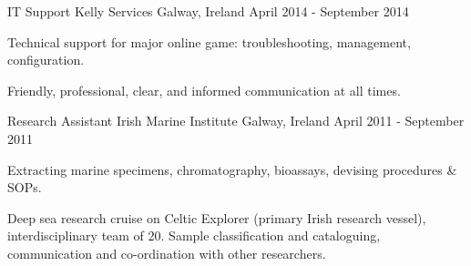 \begin{cventries}
\cventry
{IT Support} %
{Kelly Services} %
{Galway, Ireland} %
{April 2014 - September 2014} %
{ %
    \begin{cvitems}
        \item {Technical support for major online game: troubleshooting, management, configuration.}
        \item {Friendly, professional, clear, and informed communication at all times.}
    \end{cvitems}
}

\cventry
{Research Assistant} %
{Irish Marine Institute} %
{Galway, Ireland} %
{April 2011 - September 2011} %
{ %
    \begin{cvitems}
        \item {Extracting marine specimens, chromatography, bioassays, devising procedures \& SOPs.}
        \item {Deep sea research cruise on Celtic Explorer (primary Irish research vessel), interdisciplinary team of 20. Sample classification and cataloguing, communication and co-ordination with other researchers.}
    \end{cvitems}
}


\end{cventries}
